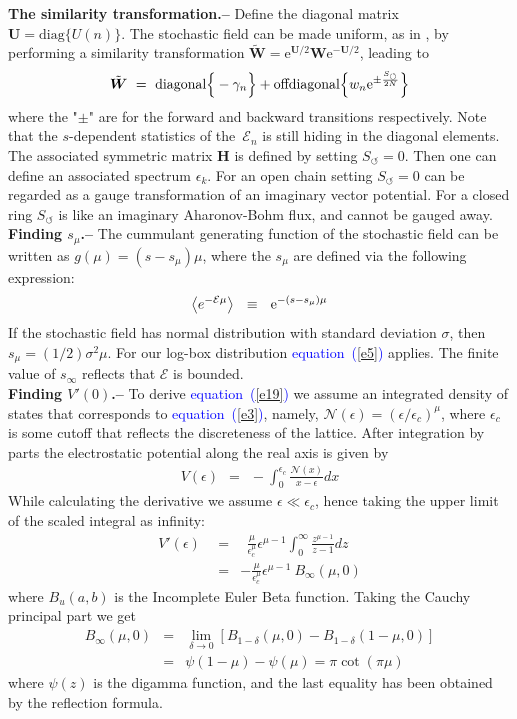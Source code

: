 \documentclass[aps,pre,floats,floatfix,twocolumn]{revtex4}
\newcommand{\eexp}[1]{\mathrm{e}^{#1}}
\newcommand{\be}[1]{\begin{eqnarray}\ifthenelse{#1=-1}{\nonumber}{\ifthenelse{#1=0}{}{\label{e#1}}}}
\newcommand{\beq}{\begin{eqnarray}}
\newcommand{\eeq}{\end{eqnarray}}
\newcommand{\Eq}[1]{\textcolor{blue}{{equation}\!~(\ref{#1})}}
\newcommand{\sect}[1]{{\bf #1.-- }}
\begin{document}
\sect{The similarity transformation}
%
Define the diagonal matrix $\bm{U}=\mbox{diag}\{U(n)\}$. 
The stochastic field can be made uniform, as in \cite{Shnerb1}, 
by performing a similarity transformation ${\tilde{\bm{W}} = \eexp{{\bm{U}/2}} \bm{W} \eexp{-{\bm{U}/2}}}$,  
leading to 
%
\be{16}
\tilde{\bm{W}} \ = \ 
\text{diagonal}\Big\{-\gamma_{n}\Big\} 
+\text{offdiagonal}\Big\{  w_{n}\eexp{\pm \frac{S_{\circlearrowleft}}{2N}}  \Big\}
\eeq
%
where the "$\pm$" are for the forward and backward transitions respectively.
Note that the $s$-dependent statistics of the~$\mathcal{E}_n$ is still hiding in the diagonal elements.
The associated symmetric matrix $\bm{H}$ is defined by setting ${S_{\circlearrowleft}=0}$.
Then one can define an associated spectrum ${\epsilon_k}$.
For an open chain setting ${S_{\circlearrowleft}=0}$ can be regarded 
as a gauge transformation of an imaginary vector potential.
For a closed ring ${S_{\circlearrowleft}}$ is like an 
imaginary Aharonov-Bohm flux, and cannot be gauged away. 
\\

\sect{Finding $s_{\mu}$}
%
The cummulant generating function of the stochastic field 
can be written as $g(\mu)=(s-s_{\mu})\mu$,  
where the $s_{\mu}$ are defined via the following expression:   
%
\be{362}
\left\langle  e^{-\mathcal{E}\mu}\right\rangle \ \ \equiv \ \ \eexp{-(s-s_{\mu})\mu} 
\eeq
%  
If the stochastic field has normal distribution 
with standard deviation $\sigma$, then ${s_{\mu}=(1/2) \sigma^2 \mu}$.
For our log-box distribution \Eq{e5} applies. 
The finite value of $s_{\infty}$ reflects that $\mathcal{E}$ is bounded.  
\\

\sect{Finding $V'(0)$}
%
To derive \Eq{e19} we assume an integrated density of states that corresponds to \Eq{e3}, 
namely, ${\mathcal{N}(\epsilon) = (\epsilon/\epsilon_c)^{\mu}}$, 
where $\epsilon_c$ is some cutoff that reflects the discreteness of the lattice.
After integration by parts the electrostatic potential along the real axis is given by 
%
\beq
V(\epsilon) \ \ = \ \ -  \int_0^{\epsilon_c} \frac{\mathcal{N}(x)}{x-\epsilon}dx
\eeq
%
While calculating the derivative we assume ${\epsilon \ll \epsilon_c}$, 
hence taking the upper limit of the scaled integral as infinity: 
%
\beq
V'(\epsilon) \ \ &=& \ \ 
\frac{\mu}{\epsilon_c^{\mu}} \epsilon^{\mu-1} \int_0^{\infty} \frac{z^{\mu-1}}{z-1}dz 
\\
&=&   
-\frac{\mu}{\epsilon_c^{\mu}}  \epsilon^{\mu-1} \ B_{\infty}(\mu,0)
\eeq  
%
where $B_u(a,b)$ is the Incomplete Euler Beta function.
Taking the Cauchy principal part we get
%
\beq
B_{\infty}(\mu,0) &=&  
\lim_{\delta \to 0}  \left[ B_{1-\delta}(\mu,0) - B_{1-\delta}(1-\mu,0) \right]  
\\
&=& \psi(1-\mu)-\psi(\mu) = \pi \cot(\pi \mu)
\eeq
%
where $\psi(z)$ is the digamma function,
and the last equality has been obtained by the reflection formula. 
\\
\end{document}
